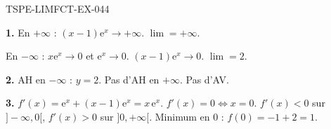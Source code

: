 \begin{corrige}{TSPE-LIMFCT-EX-044}

\textbf{1.} En $+\infty$ : $(x-1)\mathrm{e}^x \to +\infty$. $\lim = +\infty$.

En $-\infty$ : $x\mathrm{e}^x \to 0$ et $\mathrm{e}^x \to 0$. $(x-1)\mathrm{e}^x \to 0$. $\lim = \boxed{2}$.

\textbf{2.} AH en $-\infty$ : $y = 2$. Pas d'AH en $+\infty$. Pas d'AV.

\textbf{3.} $f'(x) = \mathrm{e}^x + (x-1)\mathrm{e}^x = x\,\mathrm{e}^x$. $f'(x) = 0 \iff x = 0$. $f'(x) < 0$ sur $]-\infty, 0[$, $f'(x) > 0$ sur $]0, +\infty[$. Minimum en $0$ : $f(0) = -1+2 = 1$.

\end{corrige}
